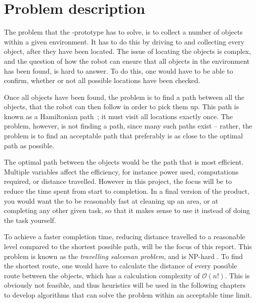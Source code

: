 \section{Problem description} \label{sec:problem-description}

The problem that the \projname{}-prototype has to solve, is to collect a number of objects within a given environment. It has to do this by driving to and collecting every object, after they have been located. The issue of locating the objects is complex, and the question of how the robot can ensure that all objects in the environment has been found, is hard to answer. To do this, one would have to be able to confirm, whether or not all possible locations have been checked.

Once all objects have been found, the problem is to find a path between all the objects, that the robot can then follow in order to pick them up. This path is known as a Hamiltonian path~\citep{sipser}; it must visit all locations exactly once. The problem, however, is not finding a path, since many such paths exist -- rather, the problem is to find an acceptable path that preferably is as close to the optimal path as possible.

The optimal path between the objects would be the path that is most efficient. Multiple variables affect the efficiency, for instance power used, computations required, or distance travelled. However in this project, the focus will be to reduce the time spent from start to completion. In a final version of the product, you would want the \projname{} to be reasonably fast at cleaning up an area, or at completing any other given task, so that it makes sense to use it instead of doing the task yourself.

To achieve a faster completion time, reducing distance travelled to a reasonable level compared to the shortest possible path, will be the focus of this report. This problem is known as the \emph{travelling salesman problem}, and is NP-hard \citep{tsp}. To find the shortest route, one would have to calculate the distance of every possible route between the objects, which has a calculation complexity of $\mathcal{O}(n!)$. This is obviously not feasible, and thus heuristics will be used in the following chapters to develop algorithms that can solve the problem within an acceptable time limit. 

